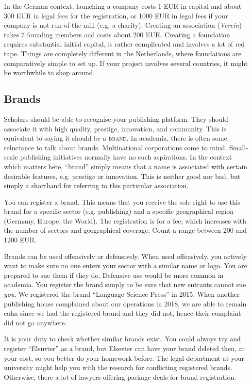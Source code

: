 \documentclass[nonflat,modfonts,output=book] {langsci/langscibook}
\begin{document}
In the German context, launching a company costs 1 EUR in capital and about 300 EUR in legal fees for the registration, or 1000 EUR in legal fees if your company is not run-of-the-mill (e.g. a charity). Creating an association (\textit{Verein}) takes 7 founding members and costs about 200 EUR. 
Creating a foundation requires substantial initial capital, is rather complicated and involves a lot of red tape. Things are completely different in the Netherlands, where foundations are comparatively simple to set up. If your project involves several countries, it might be worthwhile to shop around. 

\subsection{Brands}\label{sec:legal:brand}
Scholars should be able to recognise your publishing platform. They should associate it with high quality, prestige, innovation, and community. This is equivalent to saying it should be a \textsc{brand}. In academia, there is often some reluctance to talk about brands. Multinational corporations come to mind. Small-scale publishing initiatives normally have no such aspirations. In the context which matters here, ``brand'' simply means that a name is associated with certain desirable features, e.g. prestige or innovation. This is neither good nor bad, but simply a shorthand for referring to this particular association. 

You can register a brand. This means that you receive the sole right to use this brand for a specific sector (e.g. publishing) and a specific geographical region (Germany, Europe, the World). The registration is for a fee, which increases with the number of sectors and geographical coverage. Count a range between 200 and 1200 EUR. 

Brands can be used offensively or defensively. When used offensively, you actively want to make sure no one enters your sector with a similar name or logo. You are prepared to sue them if they do. Defensive use would be more common in academia. You register the brand simply to be sure that new entrants cannot sue \textit{you}. We registered the brand ``Language Science Press'' in 2015. When another publishing house complained about our operations in 2018, we are able to remain calm since we had the registered brand and they did not, hence their complaint did not go anywhere.

It is your duty to check whether similar brands exist. You could always try and register ``Elsuvier'' as a brand, but Elsevier can have your brand deleted then, at your cost, so you better do your homework before. The legal department at your university might help you with the research for conflicting registered brands. Otherwise, there a lot of lawyers offering package deals for brand registration. 
\end{document}
